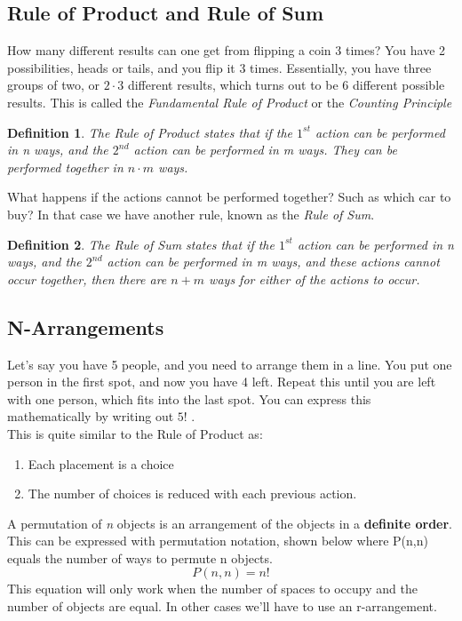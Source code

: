 \documentclass[final,1p,12pt]{elsarticle}
\newtheorem{definition}{Definition}
\begin{document}
    \subsection{Rule of Product and Rule of Sum}
    How many different results can one get from flipping a coin 3 times?
    You have 2 possibilities, heads or tails, and you flip it 3 times.
    Essentially, you have three groups of two, or $2\cdot3$ different results, which turns out to be $6$ different possible results.
    This is called the \emph{Fundamental Rule of Product} or the \emph{Counting Principle}
    \begin{definition}
        The Rule of Product states that if the $1^{st}$ action can be performed in n ways, and the $2^{nd}$ action can be performed in m ways.
        They can be performed together in $n\cdot m$ ways. 
    \end{definition}
    What happens if the actions cannot be performed together? Such as which car to buy? In that case we have another rule, known as the \emph{Rule of Sum}.
    \begin{definition}
        The Rule of Sum states that if the $1^{st}$ action can be performed in n ways, and the $2^{nd}$ action can be performed in m ways, and these actions cannot occur together, then there are $n+m$ ways for either of the actions to occur.
    \end{definition}
    
    \subsection{N-Arrangements}
    Let's say you have 5 people, and you need to arrange them in a line.
    You put one person in the first spot, and now you have 4 left. Repeat this until you are left with one person, which fits into the last spot.
    You can express this mathematically by writing out $5!$ .\\
    This is quite similar to the Rule of Product as:
    \begin{enumerate}
        \item Each placement is a choice
        \item The number of choices is reduced with each previous action. 
    \end{enumerate}
    A permutation of \emph{n} objects is an arrangement of the objects in a \textbf{definite order}.
    This can be expressed with permutation notation, shown below where P(n,n) equals the number of ways to permute n objects.
    \begin{equation*}
        P(n,n) = n!
    \end{equation*}
    This equation will only work when the number of spaces to occupy and the number of objects are equal.
    In other cases we'll have to use an r-arrangement.
    
\end{document}
